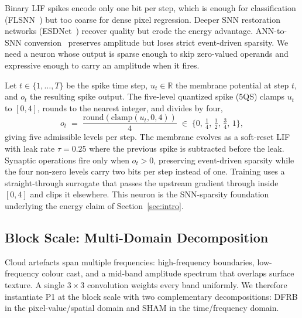 \documentclass[conference]{IEEEtran}
\newcommand{\DFRB}{\textsc{DFRB}}
\newcommand{\SHAM}{\textsc{SHAM}}
\begin{document}
Binary LIF spikes encode only one bit per step, which is enough for
classification (FLSNN~\cite{ref:flsnn}) but too coarse for dense
pixel regression. Deeper SNN restoration networks
(ESDNet~\cite{ref:esdnet}) recover quality but erode the energy
advantage. ANN-to-SNN
conversion~\cite{ref:rueckauer2017} preserves amplitude but loses
strict event-driven sparsity. We need a neuron whose output is
sparse enough to skip zero-valued operands and expressive enough
to carry an amplitude when it fires.

Let $t\!\in\!\{1,\dots,T\}$ be the spike time step,
$u_t\!\in\!\mathbb{R}$ the membrane potential at step $t$, and
$o_t$ the resulting spike output. The five-level quantized spike
(5QS) clamps $u_t$ to $[0,4]$, rounds to the nearest integer, and
divides by four,
\begin{equation}
o_t \;=\; \frac{\mathrm{round}(\mathrm{clamp}(u_t,0,4))}{4}\;\in\;
\Big\{0,\,\tfrac{1}{4},\,\tfrac{1}{2},\,\tfrac{3}{4},\,1\Big\},
\label{eq:5qs-forward}
\end{equation}
giving five admissible levels per step. The membrane evolves as a
soft-reset LIF with leak rate $\tau\!=\!0.25$ where the previous
spike is subtracted before the leak. Synaptic operations fire only when
$o_t\!>\!0$, preserving event-driven sparsity while the four
non-zero levels carry two bits per step instead of one. Training
uses a straight-through surrogate that passes the upstream gradient
through inside $[0,4]$ and clips it elsewhere. This neuron is the
SNN-sparsity foundation underlying the energy claim of
Section~\ref{sec:intro}.

\subsection{Block Scale: Multi-Domain Decomposition}
\label{sec:framework-block}

Cloud artefacts span multiple frequencies: high-frequency boundaries,
low-frequency colour cast, and a mid-band amplitude spectrum that
overlaps surface texture. A single $3\!\times\!3$ convolution
weights every band uniformly. We therefore instantiate P1 at the
block scale with two complementary decompositions: \DFRB{} in the
pixel-value/spatial domain and \SHAM{} in the time/frequency domain.
\end{document}
